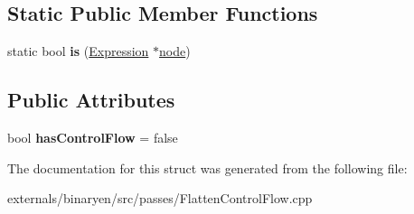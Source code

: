 \subsection*{Static Public Member Functions}
\begin{DoxyCompactItemize}
\item 
\mbox{\label{structwasm_1_1_control_flow_checker_ab0f9f646ada2f647cbbe6334edc8aa7b}} 
static bool {\bfseries is} (\mbox{\hyperlink{classwasm_1_1_expression}{Expression}} $\ast$\mbox{\hyperlink{structnode}{node}})
\end{DoxyCompactItemize}
\subsection*{Public Attributes}
\begin{DoxyCompactItemize}
\item 
\mbox{\label{structwasm_1_1_control_flow_checker_a8b84417f4e8f3aee81cd3e1c5daa40de}} 
bool {\bfseries has\+Control\+Flow} = false
\end{DoxyCompactItemize}


The documentation for this struct was generated from the following file\+:\begin{DoxyCompactItemize}
\item 
externals/binaryen/src/passes/Flatten\+Control\+Flow.\+cpp\end{DoxyCompactItemize}
